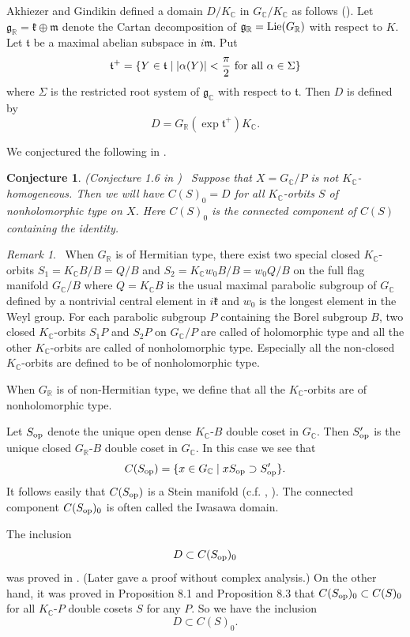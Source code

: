 \documentclass[12pt,a4paper]{amsart}
\def\frak{\mathfrak}
\newtheorem{conjecture}[theorem]{Conjecture}
\theoremstyle{definition}
\theoremstyle{remark}
\newtheorem{remark}[theorem]{Remark}
\numberwithin{equation}{section}
\def\br{\mathbb R}
\def\bc{\mathbb C}
\def\op{{\rm op}}
\begin{document}
Akhiezer and Gindikin defined a domain $D/K_\bc$ in $G_\bc/K_\bc$ as follows (\cite{AG}). Let $\frak{g}_\br=\frak{k}\oplus\frak{m}$ denote the Cartan decomposition of $\frak{g}_\br={\rm Lie}(G_\br)$ with respect to $K$. Let $\frak{t}$ be a maximal abelian subspace in $i\frak{m}$. Put
$$\frak{t}^+=\{Y\in\frak{t}\mid |\alpha(Y)|<{\pi\over 2} \mbox{ for all }\alpha\in\Sigma\}$$
where $\Sigma$ is the restricted root system of ${\frak g}_\bc$
with respect to $\frak{t}$. Then $D$ is defined by
$$D=G_\br(\exp\frak{t}^+)K_\bc.$$

We conjectured the following in \cite{GM1}.

\begin{conjecture} {\rm (Conjecture 1.6 in \cite{GM1})} \ Suppose that $X=G_\bc/P$ is not $K_\bc$-homogeneous. Then we will have $C(S)_0=D$ for all $K_\bc$-orbits $S$ of nonholomorphic type on $X$. Here $C(S)_0$ is the connected component of $C(S)$ containing the identity.
\end{conjecture}

\begin{remark} \ When $G_\br$ is of Hermitian type, there exist two special closed $K_\bc$-orbits $S_1=K_\bc B/B=Q/B$ and $S_2=K_\bc w_0B/B=w_0Q/B$ on the full flag manifold $G_\bc/B$ where $Q=K_\bc B$ is the usual maximal parabolic subgroup of $G_\bc$ defined by a nontrivial central element in $i\frak{k}$ and $w_0$ is the longest element in the Weyl group. For each parabolic subgroup $P$ containing the Borel subgroup $B$, two closed $K_\bc$-orbits $S_1P$ and $S_2P$ on $G_\bc/P$ are called of holomorphic type and all the other $K_\bc$-orbits are called of nonholomorphic type. Especially all the non-closed $K_\bc$-orbits are defined to be of nonholomorphic type.

When $G_\br$ is of non-Hermitian type, we define that all the $K_\bc$-orbits are of nonholomorphic type.
\end{remark}

Let $S_\op$ denote the unique open dense $K_\bc$-$B$ double coset in $G_\bc$. Then $S'_\op$ is the unique closed $G_\br$-$B$ double coset in $G_\bc$. In this case we see that
$$C(S_\op)=\{x\in G_\bc\mid xS_\op\supset S'_\op\}.$$
It follows easily that $C(S_\op)$ is a Stein manifold (c.f. \cite{GM1}, \cite{H}). The connected component $C(S_\op)_0$ is often called the Iwasawa domain.

The inclusion
$$D\subset C(S_\op)_0$$
was proved in \cite{H}. (Later \cite{Ms} gave a proof without complex analysis.) On the other hand, it was proved in \cite{GM1} Proposition 8.1 and Proposition 8.3 that
$C(S_\op)_0\subset C(S)_0$
for all $K_\bc$-$P$ double cosets $S$ for any $P$. So we have the inclusion
\begin{equation}
D\subset C(S)_0. \tag{1.2}
\end{equation}
\end{document}
